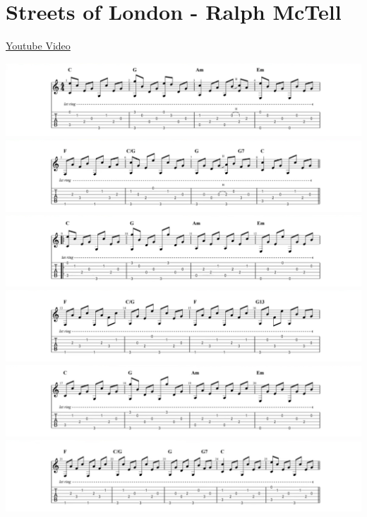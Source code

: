 \documentclass[]{book}
\let\stdsection\section
\renewcommand\section{\clearpage\stdsection}
\begin{document}
\hypertarget{streets-of-london---ralph-mctell-1}{%
\section{Streets of London - Ralph McTell}\label{streets-of-london---ralph-mctell-1}}

\href{https://youtu.be/AeR_tI47gZY}{Youtube Video}

\includegraphics{notes_and_tabs/streets_of_london_1.png}
\includegraphics{notes_and_tabs/streets_of_london_2.png}
\includegraphics{notes_and_tabs/streets_of_london_3.png}
\includegraphics{notes_and_tabs/streets_of_london_4.png}
\includegraphics{notes_and_tabs/streets_of_london_5.png}
\includegraphics{notes_and_tabs/streets_of_london_6.png}
\end{document}
